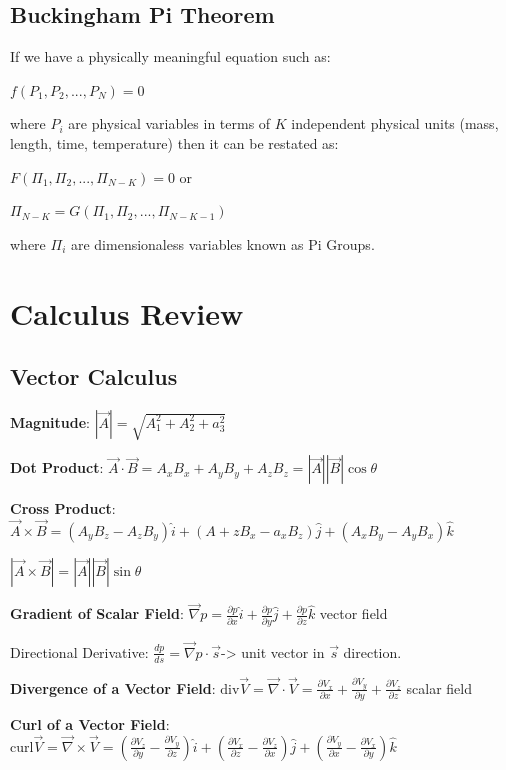 \documentclass{article}
\begin{document}
\begin{multicols*}{3}
\subsection*{Buckingham Pi Theorem}
If we have a physically meaningful equation such as:\par
$f(P_1,P_2,...,P_N) = 0$\par
where $P_i$ are physical variables in terms of $K$ independent physical units (mass, length, time, temperature) then it can be restated as:\par 
$F(\Pi_1,\Pi_2,...,\Pi_{N-K}) = 0$ or\par $\Pi_{N-K}=G(\Pi_1,\Pi_2,...,\Pi_{N-K-1})$\par 
where ${\Pi_i}$ are dimensionaless variables known as Pi Groups.

\section*{Calculus Review}
\subsection*{Vector Calculus}
\textbf{Magnitude}: $|\vec{A}|=\sqrt{A_1^2+A_2^2+a_3^2}$\par 
\textbf{Dot Product}: $\vec{A}\cdot\vec{B}=A_xB_x+A_yB_y+A_zB_z=|\vec{A}||\vec{B}|\cos{\theta}$\par 
\textbf{Cross Product}:$\vec{A}\times\vec{B}=(A_yB_z-A_zB_y)\hat{i}+(A+zB_x-a_xB_z)\hat{j}+(A_xB_y-A_yB_x)\hat{k}$\par
$|\vec{A}\times\vec{B}|=|\vec{A}||\vec{B}|\sin{\theta}$\par 
\textbf{Gradient of Scalar Field}: $\vec{\nabla}p=\frac{\partial p}{\partial x}\hat{i}+\frac{\partial p}{\partial y}\hat{j}+\frac{\partial p}{\partial z}\hat{k}$ vector field\par 
Directional Derivative: $\frac{dp}{ds}=\vec{\nabla}p\cdot\vec{s}$-> unit vector in $\vec{s}$ direction.\par 
\textbf{Divergence of a Vector Field}: $\text{div}\vec{V}=\vec{\nabla}\cdot\vec{V}=\frac{\partial V_x}{\partial x}+\frac{\partial V_y}{\partial y}+\frac{\partial V_z}{\partial z}$ scalar field\par 
\textbf{Curl of a Vector Field}: $\text{curl}\vec{V}=\vec{\nabla}\times\vec{V}=(\frac{\partial V_z}{\partial y}-\frac{\partial V_y}{\partial z})\hat{i}
+(\frac{\partial V_x}{\partial z}-\frac{\partial V_z}{\partial x})\hat{j}
+(\frac{\partial V_y}{\partial x}-\frac{\partial V_x}{\partial y})\hat{k}$\par 

\end{multicols*}
\end{document}
